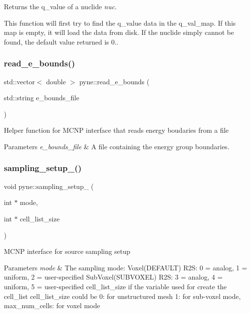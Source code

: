 Returns the q\+\_\+value of a nuclide {\itshape nuc}. 

This function will first try to find the q\+\_\+value data in the q\+\_\+val\+\_\+map. If this map is empty, it will load the data from disk. If the nuclide simply cannot be found, the default value returned is 0.. \mbox{\label{namespacepyne_ab3863857f230598b1f05504671c2bafc}} 
\subsubsection{\texorpdfstring{read\+\_\+e\+\_\+bounds()}{read\_e\_bounds()}}
{\footnotesize\ttfamily std\+::vector$<$ double $>$ pyne\+::read\+\_\+e\+\_\+bounds (\begin{DoxyParamCaption}\item[{std\+::string}]{e\+\_\+bounds\+\_\+file }\end{DoxyParamCaption})}

Helper function for M\+C\+NP interface that reads energy boudaries from a file 
\begin{DoxyParams}{Parameters}
{\em e\+\_\+bounds\+\_\+file} & A file containing the energy group boundaries. \\
\hline
\end{DoxyParams}
\mbox{\label{namespacepyne_a4e0d5dd130728ec7c2bbf6b9189cde4b}} 
\subsubsection{\texorpdfstring{sampling\+\_\+setup\+\_\+()}{sampling\_setup\_()}}
{\footnotesize\ttfamily void pyne\+::sampling\+\_\+setup\+\_\+ (\begin{DoxyParamCaption}\item[{int $\ast$}]{mode,  }\item[{int $\ast$}]{cell\+\_\+list\+\_\+size }\end{DoxyParamCaption})}

M\+C\+NP interface for source sampling setup 
\begin{DoxyParams}{Parameters}
{\em mode} & The sampling mode\+: Voxel(\+D\+E\+F\+A\+U\+L\+T) R2S\+: 0 = analog, 1 = uniform, 2 = user-\/specified Sub\+Voxel(\+S\+U\+B\+V\+O\+X\+E\+L) R2S\+: 3 = analog, 4 = uniform, 5 = user-\/specified cell\+\_\+list\+\_\+size if the variable used for create the cell\+\_\+list cell\+\_\+list\+\_\+size could be 0\+: for unstructured mesh 1\+: for sub-\/voxel mode, max\+\_\+num\+\_\+cells\+: for voxel mode \\
\hline
\end{DoxyParams}
\mbox{\label{namespacepyne_abde9d0cbfe70fd1a75a7cb2d1f59e1f1}} 
